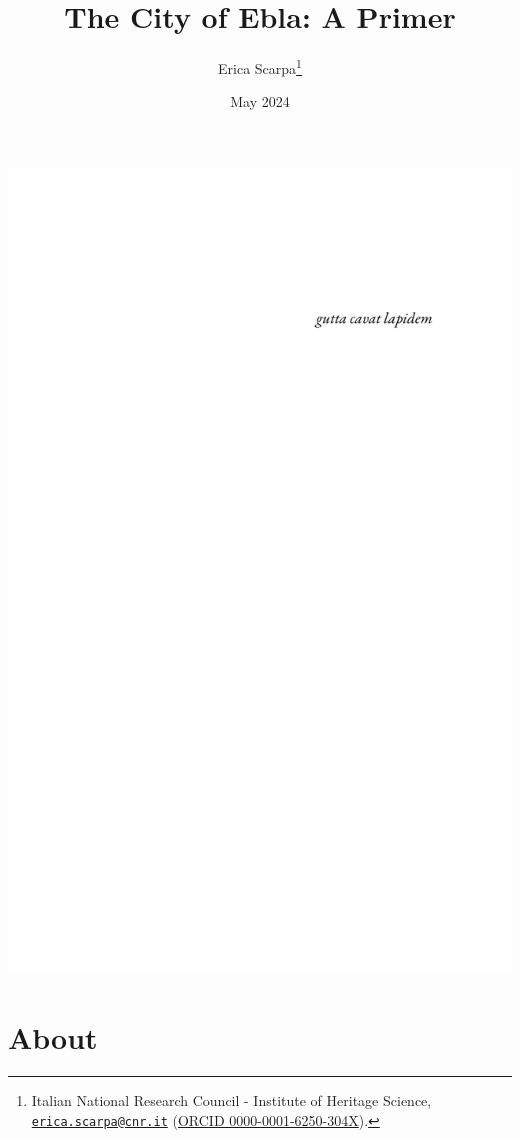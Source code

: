 \documentclass[
]{book}
\title{The City of Ebla: A Primer}
\author{Erica Scarpa\footnote{Italian National Research Council - Institute of Heritage Science, \href{mailto:erica.scarpa@cnr.it}{\nolinkurl{erica.scarpa@cnr.it}} (\href{https://orcid.org/0000-0001-6250-304X}{ORCID 0000-0001-6250-304X}).}}
\date{May 2024}
\begin{document}
\maketitle

\cleardoublepage\newpage
\thispagestyle{empty}
\begin{center}
\includegraphics{assets/dedication.pdf}
\end{center}

\setlength{\abovedisplayskip}{-5pt}
\setlength{\abovedisplayshortskip}{-5pt}

{
\hypersetup{linkcolor=}
\setcounter{tocdepth}{1}
\tableofcontents
}
\hypertarget{about}{%
\chapter*{About}\label{about}}
\end{document}
